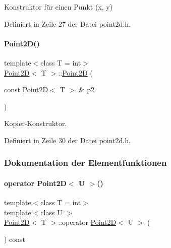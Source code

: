 Konstruktor für einen Punkt ({\ttfamily x}, {\ttfamily y}) 



Definiert in Zeile 27 der Datei point2d.\+h.

\mbox{\label{classPoint2D_ac69d6810a532c31075a3c3924c9f8610}} 
\paragraph{\texorpdfstring{Point2\+D()}{Point2D()}\hspace{0.1cm}{\footnotesize\ttfamily [3/3]}}
{\footnotesize\ttfamily template$<$class T = int$>$ \\
\mbox{\hyperlink{classPoint2D}{Point2D}}$<$ T $>$\+::\mbox{\hyperlink{classPoint2D}{Point2D}} (\begin{DoxyParamCaption}\item[{const \mbox{\hyperlink{classPoint2D}{Point2D}}$<$ T $>$ \&}]{p2 }\end{DoxyParamCaption})\hspace{0.3cm}{\ttfamily [inline]}}



Kopier-\/\+Konstruktor. 



Definiert in Zeile 30 der Datei point2d.\+h.



\subsubsection{Dokumentation der Elementfunktionen}
\mbox{\label{classPoint2D_a6cb0bced30a7c900a39188c5d1c540de}} 
\paragraph{\texorpdfstring{operator Point2\+D$<$ U $>$()}{operator Point2D< U >()}}
{\footnotesize\ttfamily template$<$class T = int$>$ \\
template$<$class U $>$ \\
\mbox{\hyperlink{classPoint2D}{Point2D}}$<$ T $>$\+::operator \mbox{\hyperlink{classPoint2D}{Point2D}}$<$ U $>$ (\begin{DoxyParamCaption}{ }\end{DoxyParamCaption}) const\hspace{0.3cm}{\ttfamily [inline]}}



